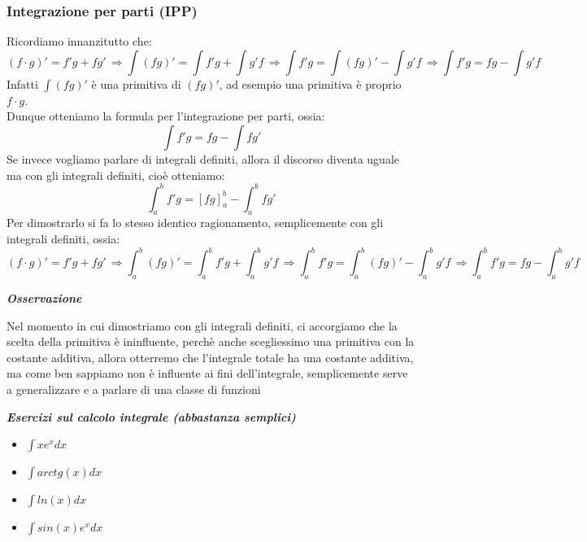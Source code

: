 \documentclass{article}
\theoremstyle{definition}
\begin{document}
\subsubsection{Integrazione per parti (IPP)}
Ricordiamo innanzitutto che:
\begin{equation*}
    (f \cdot g)'=f'g+fg' \, \Longrightarrow \int (fg)'=\int f'g + \int g' f \, \Longrightarrow \int f'g = \int (fg)' - \int g' f \, \Longrightarrow \int f'g= fg - \int g'f
\end{equation*}
Infatti $\int (fg)'$ è una primitiva di $(fg)'$, ad esempio una primitiva è proprio $f \cdot g$.
\\
Dunque otteniamo la formula per l'integrazione per parti, ossia:
\begin{equation*}
    \int f'g = fg- \int f g'
\end{equation*}
Se invece vogliamo parlare di integrali definiti, allora il discorso diventa uguale ma con gli integrali definiti, cioè otteniamo:
\begin{equation*}
    \int_a^b f'g = [fg]_a^b - \int_a^b fg'
\end{equation*}
Per dimostrarlo si fa lo stesso identico ragionamento, semplicemente con gli integrali definiti, ossia:
\begin{equation*}
    (f \cdot g)'=f'g+fg' \, \Longrightarrow \int_a^b (fg)'=\int_a^b f'g + \int_a^b g' f \, \Longrightarrow \int_a^b f'g = \int_a^b (fg)' - \int_a^b g' f \, \Longrightarrow \int_a^b f'g= fg - \int_a^b g'f
\end{equation*}

\begin{center}
    \textbf{\textit{Osservazione}}
\end{center}
Nel momento in cui dimostriamo con gli integrali definiti, ci accorgiamo che la scelta della primitiva è ininfluente, perchè anche scegliessimo una primitiva con la costante additiva, allora otterremo che l'integrale totale ha una costante additiva, ma come ben sappiamo non è influente ai fini dell'integrale, semplicemente serve a generalizzare e a parlare di una classe di funzioni

\begin{center}
\textit{\textbf{{Esercizi sul calcolo integrale (abbastanza semplici)}}}
\end{center}
\begin{itemize}
    \item $\int x e^x dx$
    \item $\int arctg(x) dx$
    \item $\int ln(x) dx$
    \item $\int sin(x) e^x dx$
\end{itemize}
\end{document}
